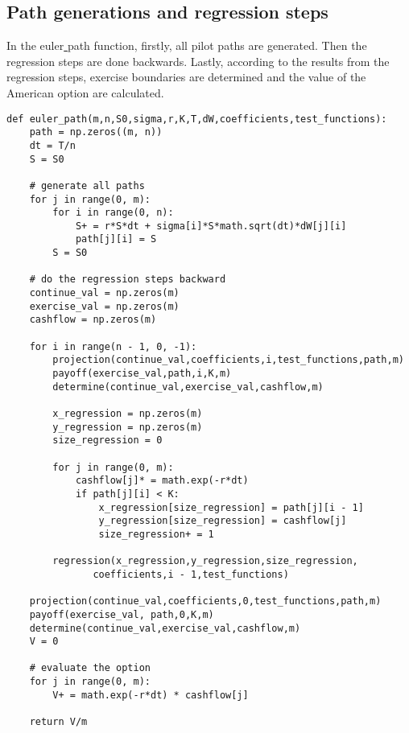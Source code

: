 \documentclass[11pt, oneside]{article}   	%
\begin{document}
\subsection{Path generations and regression steps}
In the euler\underline{ }path function, firstly, all pilot paths are generated. Then the regression steps are done backwards. Lastly, according to the results from the regression steps, exercise boundaries are determined and the value of the American option are calculated.
\lstset{language=Python}
\lstset{frame=lines}
\lstset{basicstyle=\footnotesize}
\begin{lstlisting}
def euler_path(m,n,S0,sigma,r,K,T,dW,coefficients,test_functions):
    path = np.zeros((m, n))
    dt = T/n
    S = S0

    # generate all paths
    for j in range(0, m):
        for i in range(0, n):
            S+ = r*S*dt + sigma[i]*S*math.sqrt(dt)*dW[j][i]
            path[j][i] = S
        S = S0

    # do the regression steps backward
    continue_val = np.zeros(m)
    exercise_val = np.zeros(m)
    cashflow = np.zeros(m)

    for i in range(n - 1, 0, -1):
        projection(continue_val,coefficients,i,test_functions,path,m)
        payoff(exercise_val,path,i,K,m)
        determine(continue_val,exercise_val,cashflow,m)

        x_regression = np.zeros(m)
        y_regression = np.zeros(m)
        size_regression = 0

        for j in range(0, m):
            cashflow[j]* = math.exp(-r*dt)
            if path[j][i] < K:
                x_regression[size_regression] = path[j][i - 1]
                y_regression[size_regression] = cashflow[j]
                size_regression+ = 1

        regression(x_regression,y_regression,size_regression,
        	   coefficients,i - 1,test_functions)

    projection(continue_val,coefficients,0,test_functions,path,m)
    payoff(exercise_val, path,0,K,m)
    determine(continue_val,exercise_val,cashflow,m)
    V = 0
    
    # evaluate the option
    for j in range(0, m):
        V+ = math.exp(-r*dt) * cashflow[j]
        
    return V/m
\end{lstlisting}
\end{document}
